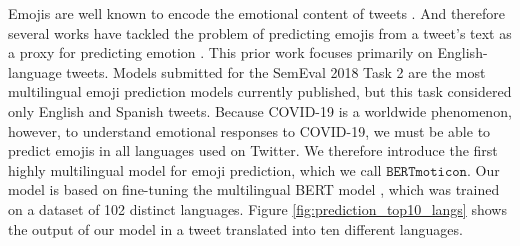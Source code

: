 \documentclass[11pt]{article}
\newcommand{\bertmoji}{\texttt{BERTmoticon}}
\begin{document}
Emojis are well known to encode the emotional content of tweets \citep{sari2014user,kralj2015sentiment,eisner2016emoji2vec,wood2016emoji,felbo2017using,shoeb2019emotag}.
And therefore several works have tackled the problem of predicting emojis from a tweet's text as a proxy for predicting emotion \citep{barbieri2017emojis,felbo2017using,Zhang2019}.
This prior work focuses primarily on English-language tweets.
Models submitted for the SemEval 2018 Task 2 \citep{barbieri2018semeval} are the most multilingual emoji prediction models currently published,
but this task considered only English and Spanish tweets.
Because COVID-19 is a worldwide phenomenon, however, to understand emotional responses to COVID-19, we must be able to predict emojis in all languages used on Twitter.
We therefore introduce the first highly multilingual model for emoji prediction, which we call $\bertmoji$.
Our model is based on fine-tuning the multilingual BERT model \citep{devlin2018bert},
which was trained on a dataset of 102 distinct languages.
Figure \ref{fig:prediction_top10_langs} shows the output of our model in a tweet translated into ten different languages.

\end{document}

